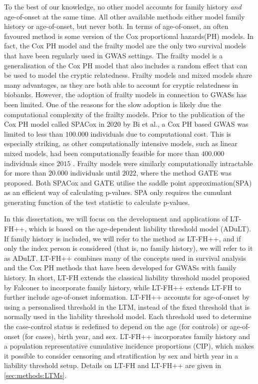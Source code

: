 To the best of our knowledge, no other model accounts for family history \textit{and} age-of-onset at the same time. All other available methods either model family history or age-of-onset, but never both. In terms of age-of-onset, an often favoured method is some version of the Cox proportional hazards(PH) models. In fact, the Cox PH model and the frailty model are the only two survival models that have been regularly used in GWAS settings. The frailty model is a generalisation of the Cox PH model that also includes a random effect that can be used to model the cryptic relatedness. Frailty models and mixed models share many advantages, as they are both able to account for cryptic relatedness in biobanks. However, the adoption of frailty models in connection to GWASs has been limited. One of the reasons for the slow adoption is likely due the computational complexity of the frailty models. Prior to the publication of the Cox PH model called SPACox in $ 2020 $ by Bi et al., a Cox PH based GWAS was limited to less than $ 100.000 $ individuals due to computational cost\cite{bi2020fast}. This is especially striking, as other computationally intensive models, such as linear mixed models, had been computationally feasible for more than $ 400.000 $ individuals since $ 2015 $ \cite{loh2015efficient}. Frailty models were similarly computationally intractable for more than $ 20.000 $ individuals until $ 2022 $, where the method GATE was proposed\cite{dey2022efficient}. Both SPACox and GATE utilise the saddle point approximation(SPA) as an efficient way of calculating p-values. SPA only requires the cumulant generating function of the test statistic to calculate p-values.

In this dissertation, we will focus on the development and applications of LT-FH++, which is based on the age-dependent liability threshold model (ADuLT). If family history is included, we will refer to the method as LT-FH++, and if only the index person is considered (that is, no family history), we will refer to it as ADuLT. LT-FH++ combines many of the concepts used in survival analysis and the Cox PH methods that have been developed for GWASs with family history. In short, LT-FH extends the classical liability threshold model proposed by Falconer\cite{falconer1965inheritance,falconer1967inheritance} to incorporate family history, while LT-FH++ extends LT-FH to further include age-of-onset information. LT-FH++ accounts for age-of-onset by using a personalised threshold in the LTM, instead of the fixed threshold that is normally used in the liability threshold model. Each threshold used to determine the case-control status is redefined to depend on the age (for controls) or age-of-onset (for cases), birth year, and sex. LT-FH++ incorporates family history and a population representative cumulative incidence proportions (CIP), which makes it possible to consider censoring and stratification by sex and birth year in a liability threshold setup. Details on LT-FH and LT-FH++ are given in \cref{sec:methods:LTMs}.

